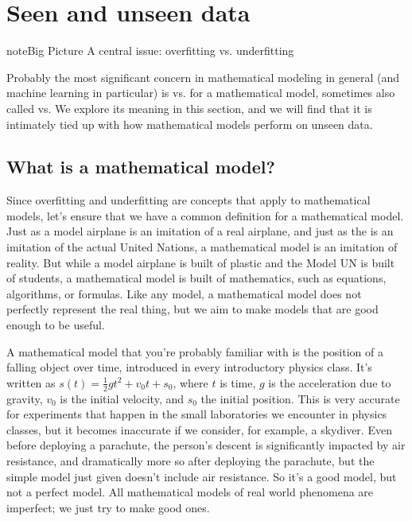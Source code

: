 \documentclass[letterpaper,10pt,english]{sphinxmanual}
\begin{document}
\section{Seen and unseen data}
\label{\detokenize{chapter-17-machine-learning:seen-and-unseen-data}}
\begin{sphinxadmonition}{note}{Big Picture \sphinxhyphen{} A central issue: overfitting vs. underfitting}

Probably the most significant concern in mathematical modeling in general (and machine learning in particular) is  vs.  for a mathematical model, sometimes also called  vs.   We explore its meaning in this section, and we will find that it is intimately tied up with how mathematical models perform on unseen data.
\end{sphinxadmonition}


\subsection{What is a mathematical model?}
\label{\detokenize{chapter-17-machine-learning:what-is-a-mathematical-model}}
Since overfitting and underfitting are concepts that apply to mathematical models, let’s ensure that we have a common definition for a mathematical model.  Just as a model airplane is an imitation of a real airplane, and just as the  is an imitation of the actual United Nations, a mathematical model is an imitation of reality.  But while a model airplane is built of plastic and the Model UN is built of students, a mathematical model is built of mathematics, such as equations, algorithms, or formulas.  Like any model, a mathematical model does not perfectly represent the real thing, but we aim to make models that are good enough to be useful.

A mathematical model that you’re probably familiar with is the position of a falling object over time, introduced in every introductory physics class.  It’s written as \(s(t)=\frac12gt^2+v_0t+s_0\), where \(t\) is time, \(g\) is the acceleration due to gravity, \(v_0\) is the initial velocity, and \(s_0\) the initial position.  This is very accurate for experiments that happen in the small laboratories we encounter in physics classes, but it becomes inaccurate if we consider, for example, a skydiver.  Even before deploying a parachute, the person’s descent is significantly impacted by air resistance, and dramatically more so after deploying the parachute, but the simple model just given doesn’t include air resistance.  So it’s a good model, but not a perfect model.  All mathematical models of real world phenomena are imperfect; we just try to make good ones.
\end{document}
